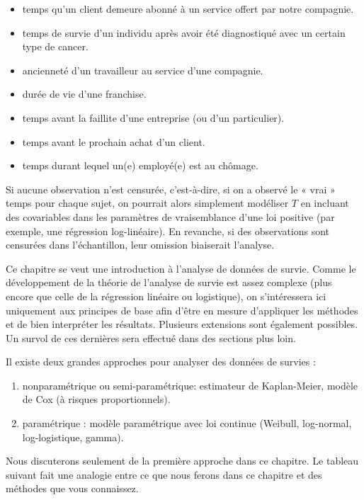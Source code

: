 \documentclass[
  11pt,
  letterpaper,
]{book}
\providecommand{\tightlist}{%
  \setlength{\itemsep}{0pt}\setlength{\parskip}{0pt}}
\theoremstyle{definition}
\theoremstyle{definition}
\theoremstyle{definition}
\theoremstyle{definition}
\theoremstyle{remark}
\begin{document}
\begin{itemize}
\tightlist
\item
  temps qu'un client demeure abonné à un service offert par notre compagnie.
\item
  temps de survie d'un individu après avoir été diagnostiqué avec un certain type de cancer.
\item
  ancienneté d'un travailleur au service d'une compagnie.
\item
  durée de vie d'une franchise.
\item
  temps avant la faillite d'une entreprise (ou d'un particulier).
\item
  temps avant le prochain achat d'un client.
\item
  temps durant lequel un(e) employé(e) est au chômage.
\end{itemize}

Si aucune observation n'est censurée, c'est-à-dire, si on a observé le « vrai » temps pour chaque sujet, on pourrait alors simplement modéliser \(T\) en incluant des covariables dans les paramètres de vraisemblance d'une loi positive (par exemple, une régression log-linéaire). En revanche, si des observations sont censurées dans l'échantillon, leur omission biaiserait l'analyse.

Ce chapitre se veut une introduction à l'analyse de données de survie. Comme le développement de la théorie de l'analyse de survie est assez complexe (plus encore que celle de la régression linéaire ou logistique), on s'intéressera ici uniquement aux principes de base afin d'être en mesure d'appliquer les méthodes et de bien interpréter les résultats. Plusieurs extensions sont également possibles. Un survol de ces dernières sera effectué dans des sections plus loin.

Il existe deux grandes approches pour analyser des données de survies :

\begin{enumerate}
\def\labelenumi{\roman{enumi})}
\tightlist
\item
  nonparamétrique ou semi-paramétrique: estimateur de Kaplan-Meier, modèle de Cox (à risques proportionnels).
\item
  paramétrique : modèle paramétrique avec loi continue (Weibull, log-normal, log-logistique, gamma).
\end{enumerate}

Nous discuterons seulement de la première approche dans ce chapitre. Le tableau suivant fait une analogie entre ce que nous ferons dans ce chapitre et des méthodes que vous connaissez.
\end{document}
